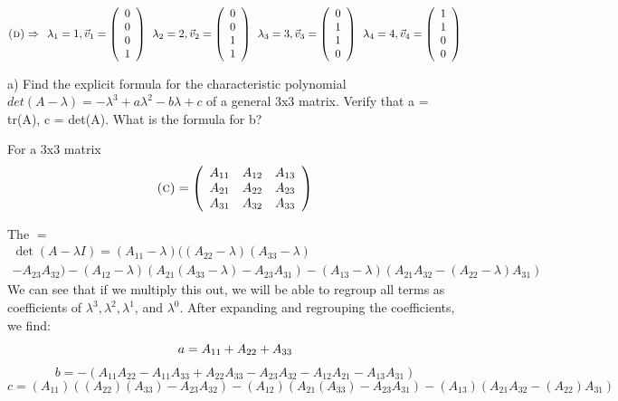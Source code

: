 \documentclass[11pt,answers]{exam}
\begin{document}
\begin{questions}
\begin{solution}
\[\hbox{\textsc{(d)}} \Rightarrow \:\: \lambda_1 = 1, \vec{v}_1 = \left(\begin{array}{c} 0 \\ 0 \\ 0 \\ 1\end{array}\right) \:\: \lambda_2 = 2, \vec{v}_2 = \left(\begin{array}{c} 0 \\ 0 \\ 1 \\ 1\end{array}\right) \:\: \lambda_3 = 3, \vec{v}_3 = \left(\begin{array}{c} 0 \\ 1 \\ 1 \\ 0\end{array}\right) \:\: \lambda_4 = 4, \vec{v}_4 = \left(\begin{array}{c} 1 \\ 1 \\ 0 \\ 0\end{array}\right)
\]
\end{solution}

\pagebreak
\item a) Find the explicit formula for the characteristic polynomial $det(A-\lambda) = -\lambda^3 +a\lambda^2 - b\lambda + c$ of a general 3x3 matrix. Verify that a = tr(A), c = det(A). What is the formula for b?

\begin{solution}
For a 3x3 matrix 
\[
\hbox{\hfill\textsc{(c)}} = \left(\begin{array}{ccc} A_{11} & A_{12} & A_{13}  \\ A_{21} & A_{22} & A_{23}  \\ A_{31} & A_{32} & A_{33}  \end{array}\right)
\]

The $ =$ 
\begin{multline*}
\det(A - \lambda I) = (A_{11} - \lambda)((A_{22}- \lambda)(A_{33}- \lambda) \\- A_{23}A_{32}) - (A_{12} - \lambda)(A_{21}(A_{33}- \lambda) - A_{23}A_{31}) - (A_{13} - \lambda)(A_{21}A_{32} - (A_{22}- \lambda)A_{31})
\end{multline*}
We can see that if we multiply this out, we will be able to regroup all terms as coefficients of $\lambda^3,\lambda^2,\lambda^1$, and $\lambda^0$. After expanding and regrouping the coefficients, we find:
\begin{equation*}
a = A_{11} + A_{22} +A_{33} \\
\end{equation*}
\begin{equation*}
b = -(A_{11}A_{22}-A_{11}A_{33}+A_{22}A_{33}-A_{23}A_{32}-A_{12}A_{21}-A_{13}A_{31})
\end{equation*}
\begin{equation*}
c = (A_{11})((A_{22})(A_{33}) - A_{23}A_{32}) - (A_{12})(A_{21}(A_{33}) - A_{23}A_{31}) - (A_{13} )(A_{21}A_{32} - (A_{22})A_{31})
\end{equation*}
\end{solution}


\end{questions}
\end{document}
